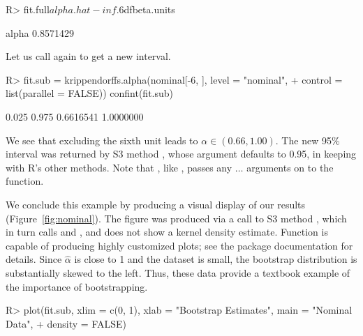 \begin{example}
R> fit.full$alpha.hat - inf.6$dfbeta.units

    alpha 
0.8571429 
\end{example}

Let us call  again to get a new interval.

\begin{example}
R> fit.sub = krippendorffs.alpha(nominal[-6, ], level = "nominal",
+                                control = list(parallel = FALSE))
confint(fit.sub)

    0.025     0.975 
0.6616541 1.0000000
\end{example}

We see that excluding the sixth unit leads to $\alpha\in(0.66,1.00)$. The new 95\% interval was returned by S3 method , whose  argument defaults to 0.95, in keeping with R's other  methods. Note that , like , passes any $\dots$ arguments on to the  function.

We conclude this example by producing a visual display of our results (Figure~\ref{fig:nominal}). The figure was produced via a call to S3 method , which in turn calls  and , and does not show a kernel density estimate. Function  is capable of producing highly customized plots; see the package documentation for details. Since $\hat{\alpha}$ is close to 1 and the dataset is small, the bootstrap distribution is substantially skewed to the left. Thus, these data provide a textbook example of the importance of bootstrapping.

\begin{example}
R> plot(fit.sub, xlim = c(0, 1), xlab = "Bootstrap Estimates", main = "Nominal Data",
+       density = FALSE)
\end{example}

